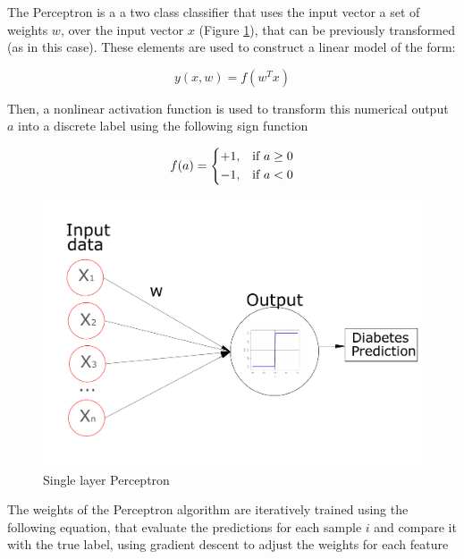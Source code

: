 \documentclass[10pt,twocolumn,letterpaper]{article}
\begin{document}
The Perceptron is a a two class classifier that uses the input vector a set of weights $w$, over the input vector $x$ (Figure \ref{fig:perceptron}), that can be previously transformed \cite{Bishop2006} (as in this case). These elements are used to construct a linear model of the form:

\begin{equation}
	y(x,w) = f(w^T x)
\end{equation}

Then, a nonlinear activation function is used to transform this numerical output $a$ into a discrete label using the following sign function \cite{Bishop2006}

\begin{equation}
f(a)= 
\begin{dcases}
+1,& \text{if } a\geq 0\\
-1,& \text{if } a< 0\\
\end{dcases}
\end{equation}


\begin{figure}[h]
	\begin{center}
		\includegraphics[width=1.0\linewidth]{Figura2.pdf}
	\end{center}
	\caption{Single layer Perceptron}
	\label{fig:perceptron}
\end{figure}


The weights of the Perceptron algorithm are iteratively trained using the following equation, that evaluate the predictions for each sample $i$ and compare it with the true label, using gradient descent to adjust the weights for each feature
\end{document}
